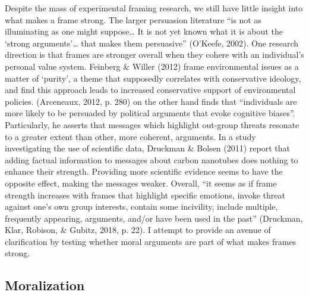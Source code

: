 \documentclass[12pt,econ]{sources/authesis}
\begin{document}
Despite the mass of experimental framing research, we still have little insight into what makes a frame strong. The larger persuasion literature ``is not as illuminating as one might suppose\ldots{} It is not yet known what it is about the `strong arguments'\ldots{} that makes them persuasive'' (O'Keefe, 2002). One research direction is that frames are stronger overall when they cohere with an individual's personal value system. Feinberg \& Willer (2012) frame environmental issues as a matter of `purity', a theme that supposedly correlates with conservative ideology, and find this approach leads to increased conservative support of environmental policies. (Arceneaux, 2012, p. 280) on the other hand finds that ``individuals are more likely to be persuaded by political arguments that evoke cognitive biases''. Particularly, he asserts that messages which highlight out-group threats resonate to a greater extent than other, more coherent, arguments. In a study investigating the use of scientific data, Druckman \& Bolsen (2011) report that adding factual information to messages about carbon nanotubes does nothing to enhance their strength. Providing more scientific evidence seems to have the opposite effect, making the messages weaker. Overall, ``it seems as if frame strength increases with frames that highlight specific emotions, invoke threat against one's own group interests, contain some incivility, include multiple, frequently appearing, arguments, and/or have been used in the past'' (Druckman, Klar, Robison, \& Gubitz, 2018, p. 22). I attempt to provide an avenue of clarification by testing whether moral arguments are part of what makes frames strong.

\hypertarget{framing-theory-moralization}{%
\subsection{Moralization}\label{framing-theory-moralization}}
\end{document}
